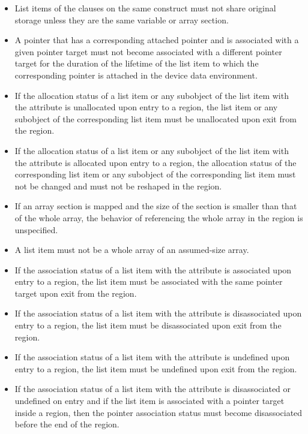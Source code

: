 \begin{fortranspecific}
\begin{itemize}
\item List items of the  clauses on the same construct must not share
      original storage unless they are the same variable or array section.
\item A pointer that has a corresponding attached pointer and is associated
    with a given pointer target must not become associated with a different
    pointer target for the duration of the lifetime of the list item to which
    the corresponding pointer is attached in the device data environment.
\item If the allocation status of a list item or any subobject of the
      list item with the  attribute is unallocated upon
      entry to a  region, the list item or any subobject of
      the corresponding list item must be unallocated upon exit from the region.
\item If the allocation status of a list item or any subobject of the
      list item with the  attribute is allocated upon
      entry to a  region, the allocation status of the
      corresponding list item or any subobject of the corresponding list
     item must not be changed and must not be reshaped in the region.
\item If an array section is mapped and the size of the section is
      smaller than that of the whole array, the behavior of referencing
      the whole array in the  region is unspecified.
\item A list item must not be a whole array of an assumed-size array.
\item If the association status of a list item with the 
      attribute is associated upon entry to a  region, the
      list item must be associated with the same pointer target upon exit
      from the region.
\item If the association status of a list item with the 
      attribute is disassociated upon entry to a  region, the
      list item must be disassociated upon exit from the region.
\item If the association status of a list item with the 
      attribute is undefined upon entry to a  region, the
      list item must be undefined upon exit from the region.
\item If the association status of a list item with the 
      attribute is disassociated or undefined on entry and if the list
      item is associated with a pointer target inside a 
      region, then the pointer association status must become
      disassociated before the end of the region.
\end{itemize}
\end{fortranspecific}

